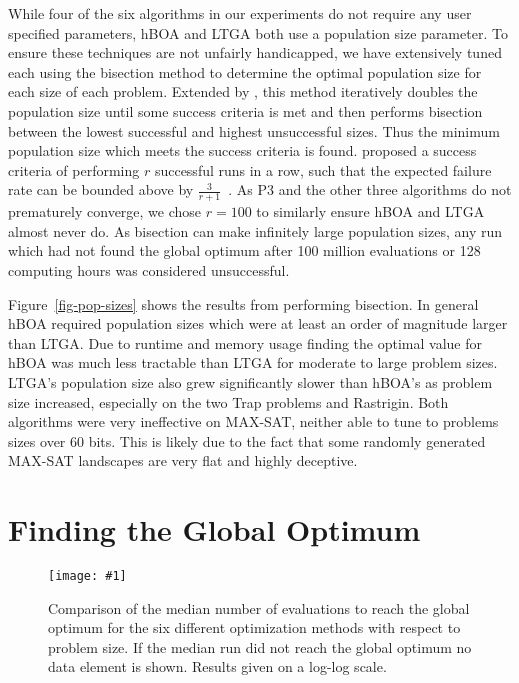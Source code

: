 \documentclass[twoside]{article}
\newcommand{\includegraphicsfit}[1]
{\texttt{[image: \#1]}}
\begin{document}
While four of the six algorithms in our experiments do not require any user specified parameters,
hBOA and LTGA both use a population size parameter. To ensure these techniques are not unfairly
handicapped, we have extensively tuned each using the bisection method \citep{sastry:2001:bisection}
to determine the optimal population size for each size of each problem.
Extended by \cite{goldman:2012:ltga}, this method iteratively
doubles the population size until some success criteria is met and then performs bisection
between the lowest successful and highest unsuccessful sizes. Thus the minimum population size
which meets the success criteria is found. \cite{goldman:2014:p3} proposed a success criteria
of performing $r$ successful runs in a row, such that the expected failure rate can be bounded
above by $\frac{3}{r+1}$~\citep{jovanovic:1997:ruleofthree}. As P3 and the other three algorithms
do not prematurely converge, we chose $r=100$ to similarly ensure hBOA and LTGA almost never do.
As bisection can make infinitely large population sizes, any run which had not found the global
optimum after 100 million evaluations or 128 computing hours was considered unsuccessful.

Figure~\ref{fig-pop-sizes} shows the results from performing bisection. In general hBOA
required population sizes which were at least an order of magnitude larger than LTGA. Due to
runtime and memory usage finding the optimal value for hBOA was much less tractable than LTGA
for moderate to large problem sizes. LTGA's population size also grew significantly slower
than hBOA's as problem size increased, especially on the two Trap problems and Rastrigin.
Both algorithms were very ineffective on MAX-SAT, neither able to tune to problems sizes over 60 bits.
This is likely due to the fact that some randomly generated MAX-SAT landscapes are very flat
and highly deceptive.
\section{Finding the Global Optimum}
\label{sec-optimum}

\begin{figure}
  \begin{center}
  \includegraphicsfit{evals-to-success}
  \end{center}
  \caption{Comparison of the median number of evaluations to reach the global optimum for
           the six different optimization methods with respect
           to problem size.  If the median run did not reach the global optimum no data element
           is shown.  Results given on a log-log scale.}
  \label{fig-evals-to-success}
\end{figure}
\end{document}
